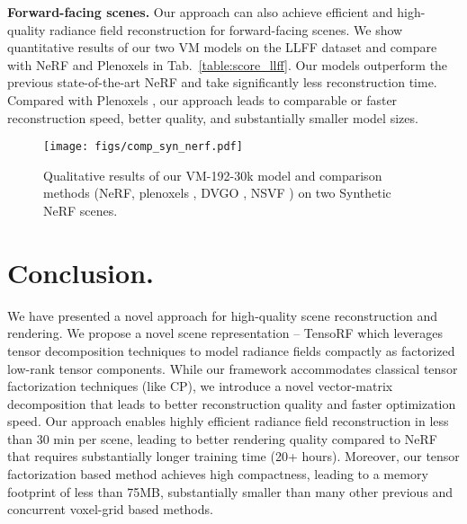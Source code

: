 \documentclass[runningheads]{llncs}
\newcommand{\boldstartspace}[1]{\vspace{0.1in}\noindent\textbf{#1}}
\begin{document}
\boldstartspace{Forward-facing scenes.}
Our approach can also achieve efficient and high-quality radiance field reconstruction for forward-facing scenes.
We show quantitative results of our two VM models on the LLFF dataset \cite{llff} and compare with NeRF and Plenoxels in Tab.~\ref{table:score_llff}.
Our models outperform the previous state-of-the-art NeRF and take significantly less reconstruction time.
Compared with Plenoxels \cite{yu2021plenoxels}, our approach leads to comparable or faster reconstruction speed, better quality, and substantially smaller model sizes.



\begin{figure}[t]
    \centering
    \texttt{[image: figs/comp\_syn\_nerf.pdf]}
    \vspace{-2mm}
    \caption{Qualitative results of our VM-192-30k model and comparison methods (NeRF\cite{mildenhall2020nerf}, plenoxels \cite{yu2021plenoxels}, DVGO \cite{sun2021direct}, NSVF \cite{liu2020neural}) on two Synthetic NeRF scenes. }
    \label{fig:restuls}\vspace{-5mm}
\end{figure}















\section{Conclusion.}
We have presented a novel approach for high-quality scene reconstruction and rendering. We propose a novel scene representation -- TensoRF which leverages tensor decomposition techniques to model  radiance fields compactly as factorized low-rank tensor components.
While our framework accommodates classical tensor factorization techniques (like CP), we introduce a novel vector-matrix decomposition that leads to better reconstruction quality and faster optimization speed.
Our approach enables highly efficient radiance field reconstruction in less than 30 min per scene, leading to better rendering quality compared to NeRF that requires substantially longer training time (20+ hours).
Moreover, our tensor factorization based method achieves high compactness, leading to a memory footprint of less than 75MB, substantially smaller than many other previous and concurrent voxel-grid based methods. 
\end{document}
